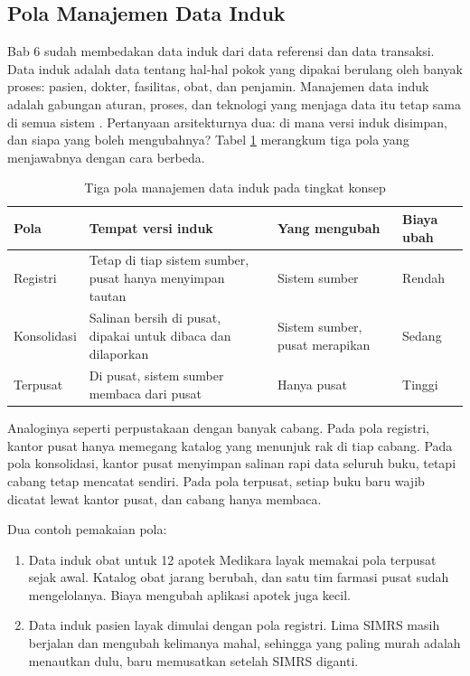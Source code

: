\subsection*{Pola Manajemen Data Induk}

Bab 6 sudah membedakan data induk dari data referensi dan data transaksi.
Data induk adalah data tentang hal-hal pokok yang dipakai berulang oleh banyak
proses: pasien, dokter, fasilitas, obat, dan penjamin. Manajemen data induk
adalah gabungan aturan, proses, dan teknologi yang menjaga data itu tetap sama
di semua sistem \cite{dmbok2}. Pertanyaan arsitekturnya dua: di mana versi
induk disimpan, dan siapa yang boleh mengubahnya? Tabel
\ref{tab:ch09-pola-data-induk} merangkum tiga pola yang menjawabnya dengan
cara berbeda.

\begin{table}[!htb]
  \centering
  \caption{Tiga pola manajemen data induk pada tingkat konsep}
  \label{tab:ch09-pola-data-induk}
  \small
  \begin{tabularx}{\textwidth}{lXXl}
    \hline
    \textbf{Pola} & \textbf{Tempat versi induk} & \textbf{Yang mengubah} & \textbf{Biaya ubah} \\
    \hline
    Registri & Tetap di tiap sistem sumber, pusat hanya menyimpan tautan & Sistem sumber & Rendah \\
    \hline
    Konsolidasi & Salinan bersih di pusat, dipakai untuk dibaca dan dilaporkan & Sistem sumber, pusat merapikan & Sedang \\
    \hline
    Terpusat & Di pusat, sistem sumber membaca dari pusat & Hanya pusat & Tinggi \\
    \hline
  \end{tabularx}
\end{table}

Analoginya seperti perpustakaan dengan banyak cabang. Pada pola registri,
kantor pusat hanya memegang katalog yang menunjuk rak di tiap cabang. Pada
pola konsolidasi, kantor pusat menyimpan salinan rapi data seluruh buku,
tetapi cabang tetap mencatat sendiri. Pada pola terpusat, setiap buku baru
wajib dicatat lewat kantor pusat, dan cabang hanya membaca.

Dua contoh pemakaian pola:
\begin{enumerate}
  \item Data induk obat untuk 12 apotek Medikara layak memakai pola terpusat
        sejak awal. Katalog obat jarang berubah, dan satu tim farmasi pusat
        sudah mengelolanya. Biaya mengubah aplikasi apotek juga kecil.
  \item Data induk pasien layak dimulai dengan pola registri. Lima SIMRS
        masih berjalan dan mengubah kelimanya mahal, sehingga yang paling
        murah adalah menautkan dulu, baru memusatkan setelah SIMRS diganti.
\end{enumerate}

